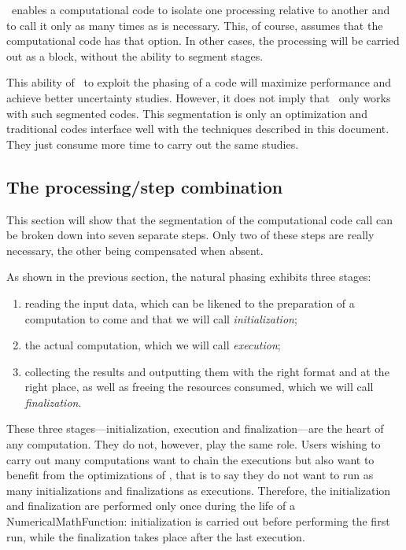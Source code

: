 \OT\ enables a computational code to isolate one processing relative to another and to call it only as many times as is necessary. This, of course, assumes that the computational code has that option. In other cases, the processing will be carried out as a block, without the ability to segment stages.

This ability of \OT\ to exploit the phasing of a code will maximize performance and achieve better uncertainty studies. However, it does not imply that \OT\ only works with such segmented codes. This segmentation is only an optimization and traditional codes interface well with the techniques described in this document. They just consume more time to carry out the same studies.

\subsection{The processing/step combination}

This section will show that the segmentation of the computational code call can be broken down into seven separate steps. Only two of these steps are really necessary, the other being compensated when absent.

As shown in the previous section, the natural phasing exhibits three stages:

\begin{enumerate}
\item reading the input data, which can be likened to the preparation of a computation to come and that we will call \emph{initialization};
\item the actual computation, which we will call \emph{execution};
\item collecting the results and outputting them with the right format and at the right place, as well as freeing the resources consumed, which we will call \emph{finalization}.
\end{enumerate}

These three stages---initialization, execution and finalization---are the heart of any computation. They do not, however, play the same role. Users wishing to carry out many computations want to chain the executions but also want to benefit from the optimizations of \OT, that is to say they do not want to run as many initializations and finalizations as executions. Therefore, the initialization and finalization are performed only once during the life of a NumericalMathFunction: initialization is carried out before performing the first run, while the finalization takes place after the last execution.

